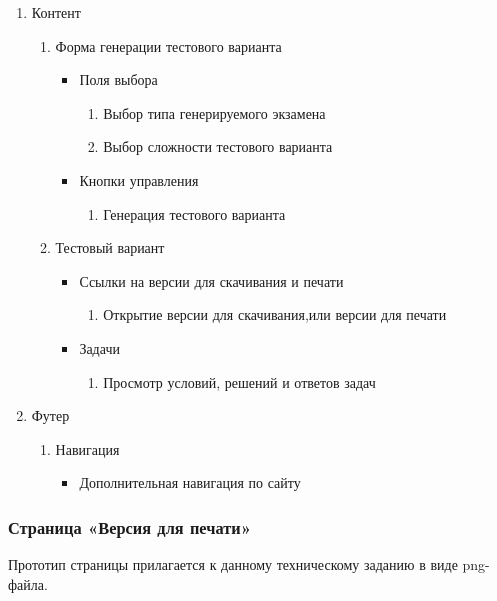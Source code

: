 \begin{enumerate}
	\item Контент
	\begin{enumerate}
		\item Форма генерации тестового варианта
		\begin{itemize}
			\item Поля выбора
			\begin{enumerate}
				\item Выбор типа генерируемого экзамена
				\item Выбор сложности тестового варианта
			\end{enumerate}
			\item Кнопки управления
			\begin{enumerate}
				\item Генерация тестового варианта
			\end{enumerate}
		\end{itemize}

		\item Тестовый вариант
		\begin{itemize}
			\item Ссылки на версии для скачивания и печати
			\begin{enumerate}
				\item Открытие версии для скачивания,или версии для печати
			\end{enumerate}
			\item Задачи
			\begin{enumerate}
				\item Просмотр условий, решений и ответов задач
			\end{enumerate}
		\end{itemize}
	\end{enumerate}

	\item Футер
	\begin{enumerate}
		\item Навигация
		\begin{itemize}
			\item Дополнительная навигация по сайту
		\end{itemize}
	\end{enumerate}
\end{enumerate}


\subsubsection{Страница «Версия для печати»}

Прототип страницы прилагается к данному техническому заданию в виде png-файла.

